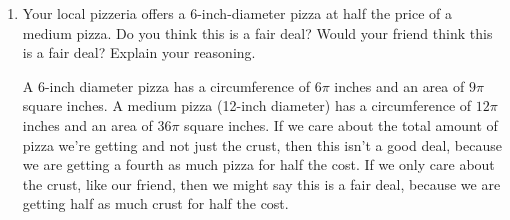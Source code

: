 \documentclass{article}
\begin{document}
\begin{enumerate}[topsep=0pt]
\begin{enumerate}
    \item 
    \begin{problem}
        Your local pizzeria offers a 6-inch-diameter pizza at half the price of a medium pizza. Do you think this is a fair deal? Would your friend think this is a fair deal? Explain your reasoning.
    \end{problem}
    \pspace{\vfill}

    \begin{solution}
        A 6-inch diameter pizza has a circumference of $6\pi$ inches and an area of $9\pi$ square inches. A medium pizza (12-inch diameter) has a circumference of $12\pi$ inches and an area of $36\pi$ square inches. If we care about the total amount of pizza we're getting and not just the crust, then this isn't a good deal, because we are getting a fourth as much pizza for half the cost. If we only care about the crust, like our friend, then we might say this is a fair deal, because we are getting half as much crust for half the cost.
    \end{solution}
\end{enumerate}

\end{enumerate}

\psreflection{

}
\end{document}
